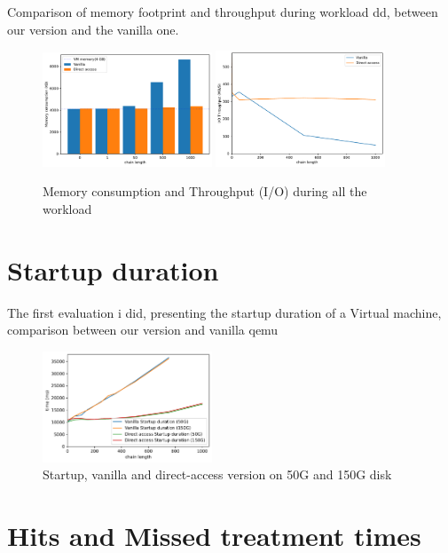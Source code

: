 \documentclass[sigplan,screen,10pt]{acmart}
\begin{document}
	Comparison of memory footprint and throughput during workload dd, between our version and the vanilla one.
	
	\begin{figure}[h]
		\center
		\includegraphics[width=0.45\textwidth]{memory_consumption.pdf}
		\includegraphics[width=0.45\textwidth]{workload_dd_throughput.pdf}
		\caption{Memory consumption and Throughput (I/O) during all the workload}
		\label{fig:fig3}
	\end{figure}
	
	\section*{Startup duration}
	
	The first evaluation i did, presenting the startup duration of a Virtual machine, comparison between our version and vanilla qemu
	
	\begin{figure}[h]
		\center
		\includegraphics[width=0.45\textwidth]{startup_duration.pdf}
		\caption{Startup, vanilla and direct-access version on 50G and 150G disk}
		\label{fig:fig34}
	\end{figure}

	\section*{Hits and Missed treatment times}
	
\end{document}

